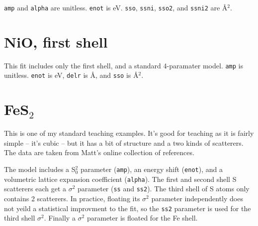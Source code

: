 \documentclass{article}
\let\stdsection\section
\renewcommand\section{\newpage\stdsection}
\begin{document}
\texttt{amp} and \texttt{alpha} are unitless.  \texttt{enot} is eV.
\texttt{sso}, \texttt{ssni}, \texttt{sso2}, and \texttt{ssni2} are
\AA$^2$.


\renewcommand{\feffMaterial}{NiO}
\renewcommand{\feffRone}{2.5}
\renewcommand{\feffRtwo}{3}
\renewcommand{\feffRthree}{3.7}
\renewcommand{\feffRfour}{4.2}
\renewcommand{\feffRfive}{4.7}
\renewcommand{\feffFirst}{}

\small

\scfsevenplots




\section{NiO, first shell}

\normalsize
This fit includes only the first shell, and a standard 4-paramater
model.  \texttt{amp} is unitless.  \texttt{enot} is eV, \texttt{delr}
is \AA, and \texttt{sso} is \AA$^2$.


\renewcommand{\feffFirst}{_1st}

\small

\scfsevenplots






\section{FeS$_2$}
\normalsize

This is one of my standard teaching examples.  It's good for teaching
as it is fairly simple -- it's cubic -- but it has a bit of structure
and a two kinds of scatterers.  The data are taken from Matt's online
collection of references.

The model includes a S$_0^2$ parameter (\texttt{amp}), an energy shift
(\texttt{enot}), and a volumetric lattice expansion coefficient
(\texttt{alpha}).  The first and second shell S scatterers each get a
$\sigma^2$ parameter (\texttt{ss} and \texttt{ss2}).  The third shell
of S atoms only contains 2 scatterers.  In practice, floating its
$\sigma^2$ parameter independently does not yeild a statistical
improvment to the fit, so the \texttt{ss2} parameter is used for the
third shell $\sigma^2$.  Finally a $\sigma^2$ parameter is floated for
the Fe shell.
\end{document}
